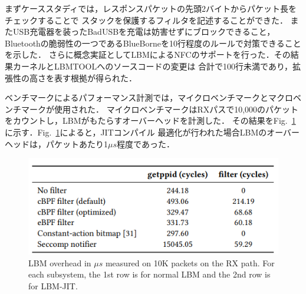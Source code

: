 \documentclass[platex,a4j,10pt,twoside,twocolumn,dvipdfmx]{jsarticle}
\newcommand{\Fref}[1]{Fig.~\ref{#1}}
\begin{document}
      まずケーススタディでは，レスポンスパケットの先頭2バイトからパケット長をチェックすることで
      スタックを保護するフィルタを記述することができた．
      またUSB充電器を装ったBadUSBを充電は妨害せずにブロックできること，
      Bluetoothの脆弱性の一つであるBlueBorne\cite{BlueBorn43:online}を10行程度のルールで対策できることを示した．
      さらに概念実証としてLBMによるNFCのサポートを行った．その結果カーネルとLBMTOOLへのソースコードの変更は
      合計で100行未満であり，拡張性の高さを表す根拠が得られた．

      ベンチマークによるパフォーマンス計測では，マイクロベンチマークとマクロベンチマークが使用された．
      マイクロベンチマークはRXパスで10,000のパケットをカウントし，LBMがもたらすオーバーヘッドを計測した．
      その結果を\Fref{img:usb-latency}に示す．\Fref{img:usb-latency}によると，JITコンパイル
      最適化が行われた場合LBMのオーバーヘッドは，パケットあたり1$\mu s$程度であった．
      \begin{figure}[tp]
        \begin{center}
          \includegraphics[width=\columnwidth]{./img/micro-bench.png}
        \end{center}
        \caption{LBM overhead in $\mu s$ measured on 10K packets on the RX path. 
        For each subsystem, the 1st row is for normal LBM and the 2nd row is for LBM-JIT.\cite{tian2019lbm}}
        \label{img:usb-latency}
      \end{figure}
\end{document}
